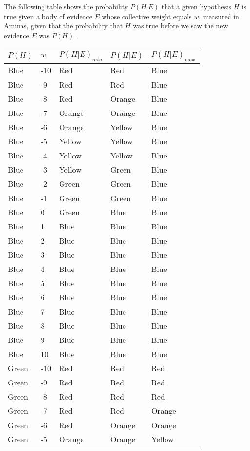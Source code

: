 \documentclass[
]{article}
\begin{document}
The following table shows the probability \(P(H|E)\) that a given
hypothesis \(H\) is true given a body of evidence \(E\) whose collective
weight equals \(w\), measured in Aminas, given that the probability that
\(H\) was true before we saw the new evidence \(E\) was \(P(H)\).

\begin{longtable}[]{@{}lllll@{}}
\toprule\noalign{}
\(P(H)\) & \(w\) & \(P(H|E)_{min}\) & \(P(H|E)\) & \(P(H|E)_{max}\) \\
\midrule\noalign{}
\endhead
\bottomrule\noalign{}
\endlastfoot
Blue & -10 & Red & Red & Blue \\
Blue & -9 & Red & Red & Blue \\
Blue & -8 & Red & Orange & Blue \\
Blue & -7 & Orange & Orange & Blue \\
Blue & -6 & Orange & Yellow & Blue \\
Blue & -5 & Yellow & Yellow & Blue \\
Blue & -4 & Yellow & Yellow & Blue \\
Blue & -3 & Yellow & Green & Blue \\
Blue & -2 & Green & Green & Blue \\
Blue & -1 & Green & Green & Blue \\
Blue & 0 & Green & Blue & Blue \\
Blue & 1 & Blue & Blue & Blue \\
Blue & 2 & Blue & Blue & Blue \\
Blue & 3 & Blue & Blue & Blue \\
Blue & 4 & Blue & Blue & Blue \\
Blue & 5 & Blue & Blue & Blue \\
Blue & 6 & Blue & Blue & Blue \\
Blue & 7 & Blue & Blue & Blue \\
Blue & 8 & Blue & Blue & Blue \\
Blue & 9 & Blue & Blue & Blue \\
Blue & 10 & Blue & Blue & Blue \\
Green & -10 & Red & Red & Red \\
Green & -9 & Red & Red & Red \\
Green & -8 & Red & Red & Red \\
Green & -7 & Red & Red & Orange \\
Green & -6 & Red & Orange & Orange \\
Green & -5 & Orange & Orange & Yellow \\

\end{longtable}
\end{document}
